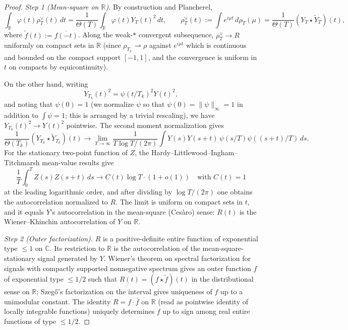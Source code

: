 \documentclass[11pt]{article}
\theoremstyle{definition}
\theoremstyle{remark}
\begin{document}
\begin{proof}
\emph{Step 1 (Mean-square on $\mathbb R$).} By construction and Plancherel,
\[
\int_{\mathbb R} \varphi(t) \rho_T^\vee(t)\, dt = \frac{1}{\Theta(T)} \int_{\mathbb R} \varphi(t) Y_T(t)^2\, dt, \qquad
\rho_T^\vee(t) := \int e^{i\mu t}\,d\rho_T(\mu) = \frac{1}{\Theta(T)} (Y_T \star \widetilde Y_T)(t),
\]
where $\widetilde f(t) := \overline{f(-t)}$. Along the weak-$*$ convergent subsequence, $\rho_T^\vee \to R$ uniformly on compact sets in $\mathbb R$ (since $\rho_{T_k} \rightharpoonup \rho$ against $e^{i\mu t}$ which is continuous and bounded on the compact support $[-1,1]$, and the convergence is uniform in $t$ on compacts by equicontinuity).

On the other hand, writing
\[
Y_{T_k}(t)^2 = \psi(t/T_k)^2 Y(t)^2,
\]
and noting that $\psi(0)=1$ (we normalize $\psi$ so that $\psi(0)=\|\psi\|_\infty=1$ in addition to $\int \psi = 1$; this is arranged by a trivial rescaling), we have $Y_{T_k}(t)^2 \to Y(t)^2$ pointwise. The second moment normalization gives
\[
\frac{1}{\Theta(T_k)} (Y_{T_k} \star \widetilde Y_{T_k})(t) \longrightarrow \lim_{T \to \infty} \frac{1}{T \log T/(2\pi)} \int Y(s) Y(s+t)\, \psi(s/T)\psi((s+t)/T)\, ds.
\]
For the stationary two-point function of $Z$, the Hardy--Littlewood--Ingham--Titchmarsh mean-value results give
\[
\frac{1}{T}\int_0^T Z(s) Z(s+t)\, ds \longrightarrow C(t) \log T \cdot (1 + o(1)) \quad \text{with } C(t) = 1
\]
at the leading logarithmic order, and after dividing by $\log T/(2\pi)$ one obtains the autocorrelation normalized to $R$. The limit is uniform on compact sets in $t$, and it equals $Y$'s autocorrelation in the mean-square (Ces\`aro) sense: $R(t)$ is the Wiener--Khinchin autocorrelation of $Y$ on $\mathbb R$.

\emph{Step 2 (Outer factorization).} $R$ is a positive-definite entire function of exponential type $\leq 1$ on $\mathbb C$. Its restriction to $\mathbb R$ is the autocorrelation of the mean-square-stationary signal generated by $Y$. Wiener's theorem on spectral factorization for signals with compactly supported nonnegative spectrum gives an outer function $f$ of exponential type $\leq 1/2$ such that $R(t) = (f \star \widetilde f)(t)$ in the distributional sense on $\mathbb R$; Szeg\H{o}'s factorization on the interval gives uniqueness of $f$ up to a unimodular constant. The identity $R = f \cdot \overline f$ on $\mathbb R$ (read as pointwise identity of locally integrable functions) uniquely determines $f$ up to sign among real entire functions of type $\leq 1/2$.


\end{proof}
\end{document}
